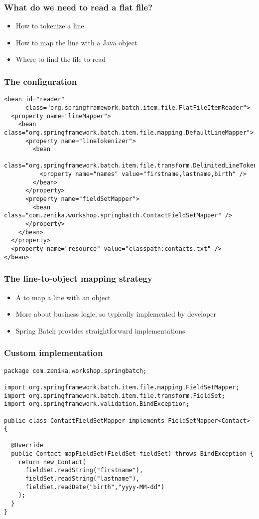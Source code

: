 \begin{frame}
 \frametitle{What do we need to read a flat file?}
 \begin{itemize}
  \item How to tokenize a line
  \item How to map the line with a Java object
  \item Where to find the file to read
 \end{itemize}
\end{frame}


\begin{frame}[fragile]
 \frametitle{The  configuration}

\lstset{language=XML}
\begin{lstlisting}
<bean id="reader"
      class="org.springframework.batch.item.file.FlatFileItemReader">
  <property name="lineMapper">
    <bean class="org.springframework.batch.item.file.mapping.DefaultLineMapper">
      <property name="lineTokenizer">
        <bean 
  class="org.springframework.batch.item.file.transform.DelimitedLineTokenizer">
          <property name="names" value="firstname,lastname,birth" />
        </bean>
      </property>
      <property name="fieldSetMapper">
        <bean class="com.zenika.workshop.springbatch.ContactFieldSetMapper" />
      </property>
    </bean>
  </property>
  <property name="resource" value="classpath:contacts.txt" />
</bean>
\end{lstlisting}

\end{frame}

\begin{frame}
 \frametitle{The line-to-object mapping strategy}
 \begin{itemize}
  \item A  to map a line with an object
  \item More about business logic, so typically implemented by developer
  \item Spring Batch provides straightforward implementations
 \end{itemize}
\end{frame}

\begin{frame}[fragile]
 \frametitle{Custom  implementation}

\lstset{language=Java}
\begin{lstlisting}
package com.zenika.workshop.springbatch;

import org.springframework.batch.item.file.mapping.FieldSetMapper;
import org.springframework.batch.item.file.transform.FieldSet;
import org.springframework.validation.BindException;

public class ContactFieldSetMapper implements FieldSetMapper<Contact> {

  @Override
  public Contact mapFieldSet(FieldSet fieldSet) throws BindException {
    return new Contact(
      fieldSet.readString("firstname"),
      fieldSet.readString("lastname"), 
      fieldSet.readDate("birth","yyyy-MM-dd")
    );
  }
}
\end{lstlisting}

\end{frame}


